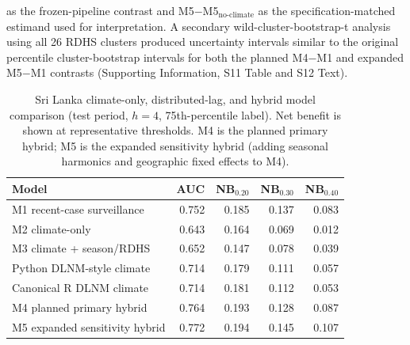 \documentclass[11pt,a4paper]{article}
\begin{document}
as the frozen-pipeline contrast and M5$-$M5$_{\text{no-climate}}$ as the specification-matched estimand used for interpretation. A secondary wild-cluster-bootstrap-t analysis using all 26 RDHS clusters produced uncertainty intervals similar to the original percentile cluster-bootstrap intervals for both the planned M4$-$M1 and expanded M5$-$M1 contrasts (Supporting Information, S11 Table and S12 Text).

\begin{table}[htbp]
\centering
\caption{Sri Lanka climate-only, distributed-lag, and hybrid model comparison (test period, $h=4$, 75th-percentile label). Net benefit is shown at representative thresholds. M4 is the planned primary hybrid; M5 is the expanded sensitivity hybrid (adding seasonal harmonics and geographic fixed effects to M4).}
\label{tab:dlnmhybrid}
\small
\begin{tabular}{lrrrr}
\toprule
Model & AUC & NB$_{0.20}$ & NB$_{0.30}$ & NB$_{0.40}$ \\
\midrule
M1 recent-case surveillance & 0.752 & 0.185 & 0.137 & 0.083 \\
M2 climate-only & 0.643 & 0.164 & 0.069 & 0.012 \\
M3 climate + season/RDHS & 0.652 & 0.147 & 0.078 & 0.039 \\
Python DLNM-style climate & 0.714 & 0.179 & 0.111 & 0.057 \\
Canonical R DLNM climate & 0.714 & 0.181 & 0.112 & 0.053 \\
M4 planned primary hybrid & 0.764 & 0.193 & 0.128 & 0.087 \\
M5 expanded sensitivity hybrid & 0.772 & 0.194 & 0.145 & 0.107 \\
\bottomrule
\end{tabular}
\end{table}
\end{document}
